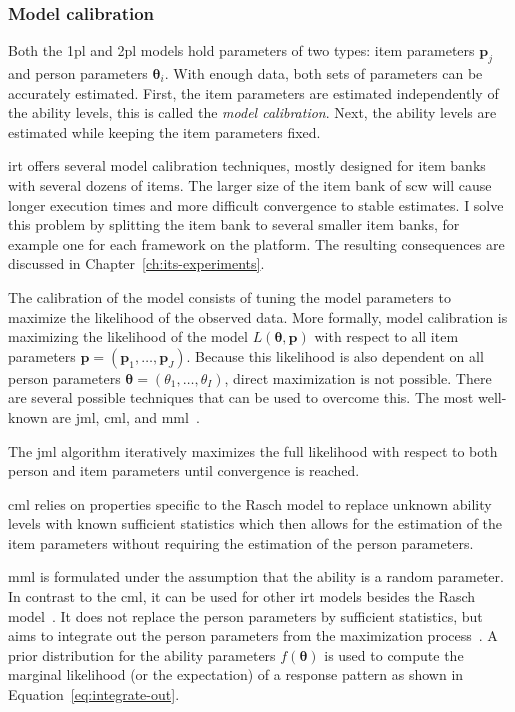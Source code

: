 \subsubsection{Model calibration}
Both the \gls{1pl} and \gls{2pl} models hold parameters of two types: item parameters $\bm{p}_j$ and person parameters $\bm{\theta}_i$. 
With enough data, both sets of parameters can be accurately estimated.
First, the item parameters are estimated independently of the ability levels, this is called the \textit{model calibration}. 
Next, the ability levels are estimated while keeping the item parameters fixed.

\Gls{irt} offers several model calibration techniques, mostly designed for item banks with several dozens of items.
The larger size of the item bank of \gls{scw} will cause longer execution times and more difficult convergence to stable estimates.
I solve this problem by splitting the item bank to several smaller item banks, for example one for each framework on the platform.
The resulting consequences are discussed in Chapter~\ref{ch:its-experiments}.

The calibration of the model consists of tuning the model parameters to maximize the likelihood of the observed data.
More formally, model calibration is maximizing the likelihood of the model $L(\bm\theta,\bm{p})$ with respect to all item parameters $\bm{p} = (\bm{p}_1,\dots,\bm{p}_J)$.
Because this likelihood is also dependent on all person parameters $\bm\theta = (\theta_1,\dots,\theta_I)$, direct maximization is not possible.
There are several possible techniques that can be used to overcome this.
The most well-known are \gls{jml}, \gls{cml}, and \gls{mml}~\cite{magis2017computerized}.

The \gls{jml} algorithm iteratively maximizes the full likelihood with respect to both person and item parameters until convergence is reached.

\Gls{cml} relies on properties specific to the Rasch model to replace unknown ability levels with known sufficient statistics which then allows for the estimation of the item parameters without requiring the estimation of the person parameters.

\Gls{mml} is formulated under the assumption that the ability is a random parameter.
In contrast to the \gls{cml}, it can be used for other \gls{irt} models besides the Rasch model~\cite{bartolucci2010point}.
It does not replace the person parameters by sufficient statistics, but aims to integrate out the person parameters from the maximization process~\cite{bartolucci2010point,magis2017computerized}.
A prior distribution for the ability parameters $f(\bm{\theta})$ is used to compute the marginal likelihood (or the expectation) of a response pattern as shown in Equation~\ref{eq:integrate-out}.

